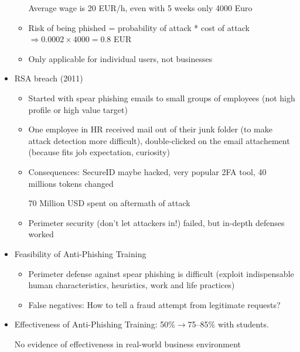 \documentclass[a4paper,12pt]{scrartcl}
\begin{document}
\begin{itemize}
\begin{itemize}
				Average wage is 20 EUR/h, even with 5 weeks only 4000 Euro
			\item
				Risk of being phished = probability of attack * cost of attack $\Rightarrow 0.0002 \times4000 = 0.8$ EUR
			\item
				Only applicable for individual users, not businesses
		\end{itemize}
	\item
		RSA breach (2011)
		\begin{itemize}
			\item
				Started with spear phishing emails to small groups of employees (not high profile or high value target)
			\item
				One employee in HR received mail out of their junk folder (to make attack detection more difficult), double-clicked on the email attachement (because fits job expectation, curiosity)
			\item
				Consequences: SecureID maybe hacked, very popular 2FA tool, 40 millions tokens changed

				70 Million USD spent on aftermath of attack  
			\item
				Perimeter security (don't let attackers in!) failed, but in-depth defenses worked
		\end{itemize}
	\item
		Feasibility of Anti-Phishing Training
		\begin{itemize}
			\item
				Perimeter defense against spear phishing is difficult (exploit indispensable human characteristics, heuristics, work and life practices)
			\item
				False negatives: How to tell a fraud attempt from legitimate requests?
		\end{itemize}
	\item
		Effectiveness of Anti-Phishing Training: 50\%$\rightarrow$75--85\% with students.

		No evidence of effectiveness in real-world business environment
\end{itemize}
\end{document}
